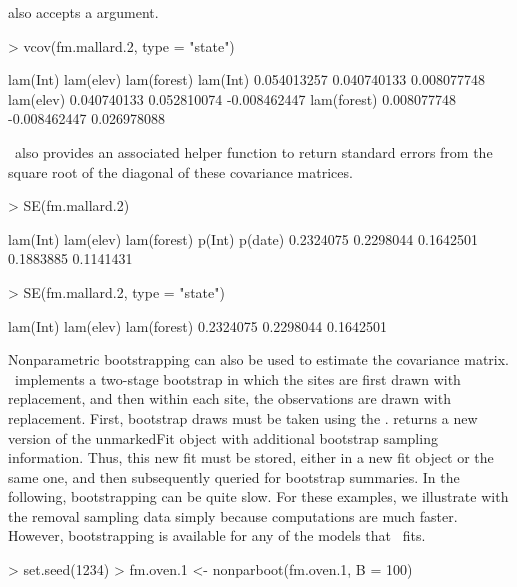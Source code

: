 \documentclass[article,shortnames]{jss}
\newcommand{\um}{\pkg{unmarked}}
\begin{document}
 also accepts a  argument.

\begin{Schunk}
\begin{Sinput}
> vcov(fm.mallard.2, type = "state")
\end{Sinput}
\begin{Soutput}
               lam(Int)    lam(elev)  lam(forest)
lam(Int)    0.054013257  0.040740133  0.008077748
lam(elev)   0.040740133  0.052810074 -0.008462447
lam(forest) 0.008077748 -0.008462447  0.026978088
\end{Soutput}
\end{Schunk}

\um\ also provides an associated helper function  to return
standard errors from the square root of the diagonal of these
covariance matrices.

\begin{Schunk}
\begin{Sinput}
> SE(fm.mallard.2)
\end{Sinput}
\begin{Soutput}
   lam(Int)   lam(elev) lam(forest)      p(Int)     p(date) 
  0.2324075   0.2298044   0.1642501   0.1883885   0.1141431 
\end{Soutput}
\begin{Sinput}
> SE(fm.mallard.2, type = "state")
\end{Sinput}
\begin{Soutput}
   lam(Int)   lam(elev) lam(forest) 
  0.2324075   0.2298044   0.1642501 
\end{Soutput}
\end{Schunk}

Nonparametric bootstrapping can also be used to estimate the
covariance matrix. \um\ implements a two-stage bootstrap in which the
sites are first drawn with replacement, and then within each site, the
observations are drawn with replacement.  First, bootstrap draws must
be taken using the .   returns a new
version of the unmarkedFit object with additional bootstrap sampling
information.  Thus, this new fit must be stored, either in a new fit
object or the same one, and then subsequently queried for bootstrap
summaries.  In the following, bootstrapping can be quite slow.  For
these examples, we illustrate with the removal sampling data simply
because computations are much faster.  However, bootstrapping is
available for any of the models that \um\ fits.

\begin{Schunk}
\begin{Sinput}
> set.seed(1234)
> fm.oven.1 <- nonparboot(fm.oven.1, B = 100)
\end{Sinput}
\end{Schunk}
\end{document}
